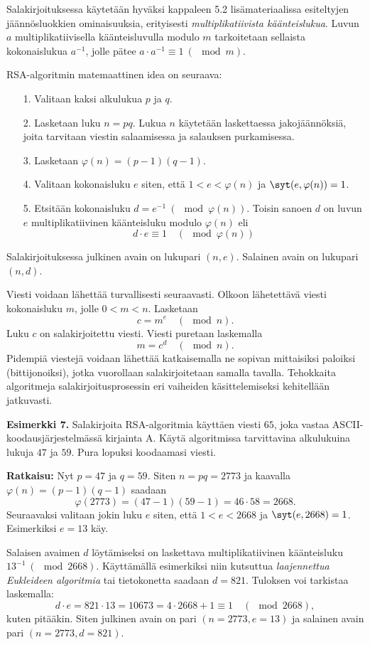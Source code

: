 Salakirjoituksessa käytetään hyväksi kappaleen 5.2 lisämateriaalissa esiteltyjen jään\-nös\-luok\-kien ominaisuuksia, erityisesti {\em multiplikatiivista käänteislukua}. Luvun $a$ multiplikatiivisella käänteisluvulla modulo $m$ tarkoitetaan sellaista kokonaislukua $a^{-1}$, jolle pätee $a\cdot a^{-1} \equiv 1 \ (\mod m)$.

RSA-algoritmin matemaattinen idea on seuraava:
\begin{itemize}
\item[1.] Valitaan kaksi alkulukua $p$ ja $q$.
\item[2.] Lasketaan luku $n=pq$. Lukua $n$ käytetään laskettaessa jakojäännöksiä, joita tarvitaan viestin salaamisessa ja salauksen purkamisessa.
\item[3.] Lasketaan $\varphi(n)=(p-1)(q-1)$. 
\item[4.] Valitaan kokonaisluku $e$ siten, että $1<e<\varphi(n)$ ja $\syt(e,\varphi(n))=1$.
\item[5.] Etsitään kokonaisluku $d = e^{-1}\ (\mod \varphi(n))$. Toisin sanoen $d$ on luvun $e$  multiplikatiivinen käänteisluku modulo $\varphi(n)$ eli
\[
d\cdot e \equiv 1\quad (\mod\varphi(n)) %
\]
\end{itemize}
Salakirjoituksessa julkinen avain on lukupari $(n,e)$. Salainen avain on lukupari $(n,d)$. 

Viesti voidaan lähettää turvallisesti seuraavasti. Olkoon lähetettävä viesti kokonaisluku $m$, jolle $0<m<n$. Lasketaan
\[
c= m^e\quad (\mod n).
\]
Luku $c$ on salakirjoitettu viesti. Viesti puretaan laskemalla
\[
m=c^d\quad (\mod n).
\]
Pidempiä viestejä voidaan lähettää katkaisemalla ne sopivan mittaisiksi paloiksi (bittijonoiksi), jotka vuorollaan salakirjoitetaan samalla tavalla. Tehokkaita algoritmeja salakirjoitusprosessin eri vaiheiden käsittelemiseksi kehitellään jatkuvasti.

{\bf Esimerkki 7.} Salakirjoita RSA-algoritmia käyttäen viesti $65$, joka vastaa ASCII-koodausjärjestelmässä kirjainta A. Käytä algoritmissa tarvittavina alkulukuina lukuja $47$ ja $59$. Pura lopuksi koodaamasi viesti.

{\bf Ratkaisu:} 
Nyt $p = 47$ ja $q = 59$. Siten $n=pq=2773$ ja kaavalla $\varphi(n)=(p-1)(q-1)$ saadaan
\[
\varphi(2773)=(47-1)(59-1)=46\cdot 58 =2668.
\]
Seuraavaksi valitaan jokin luku $e$ siten, että $1<e<2668$ ja $\syt(e,2668)=1$. Esimerkiksi $e=13$ käy.

Salaisen avaimen $d$ löytämiseksi on laskettava multiplikatiivinen käänteisluku $13^{-1}\ (\mod 2668)$. Käyttämällä esimerkiksi niin kutsuttua {\em laajennettua Eukleideen algoritmia} tai tietokonetta saadaan $d=821$. Tuloksen voi tarkistaa laskemalla:
\[
d \cdot e = 821 \cdot 13 = 10673 = 4\cdot 2668 + 1 \equiv 1 \quad (\mod 2668),
\]
kuten pitääkin. Siten julkinen avain on pari $(n=2773, e=13)$ ja salainen avain pari $(n=2773, d=821)$.

